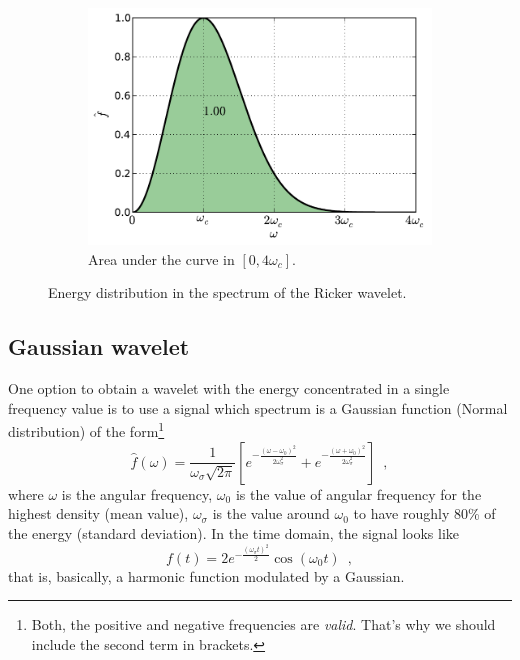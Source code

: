 \documentclass[12pt,letterpaper]{article}
\begin{document}
{\begin{figure}[h]
\begin{subfigure}[b]{0.45\textwidth}
        \includegraphics[width=\textwidth]{img/ricker_area=4.pdf}
        \caption{Area under the curve in $[0,4\omega_c]$.}
    \end{subfigure}
    \caption{Energy distribution in the spectrum of the Ricker wavelet.}
    \label{fig:ricker-areas}
\end{figure}

\subsection{Gaussian wavelet}
One option to obtain a wavelet with the energy concentrated in a single frequency value is to use a signal which spectrum is a Gaussian function (Normal distribution) of the form\footnote{Both, the positive and negative frequencies are \textit{valid}. That's why we should include the second term in brackets.}
\begin{equation}\label{eq:gaussian_freq}
\hat{f}(\omega)=\frac{1}{\omega_\sigma \sqrt{2\pi}} \left[e^{-\frac{(\omega - \omega_0)^2}{2\omega_\sigma^2}}+ e^{-\frac{(\omega + \omega_0)^2}{2\omega_\sigma^2}} \right] \enspace ,
\end{equation}
where \(\omega\) is the angular frequency, \(\omega_0\) is the value of angular frequency for the highest density (mean value), \(\omega_\sigma\) is the value around \(\omega_0\) to have roughly 80\% of the energy (standard deviation). In the time domain, the signal looks like
\begin{equation}\label{eq:gaussian_time}
f(t) = 2 e^{-\frac{(\omega_\sigma t)^2}{2}}\cos(\omega_0 t) \enspace ,
\end{equation}
that is, basically, a harmonic function modulated by a Gaussian.

}
\end{document}
